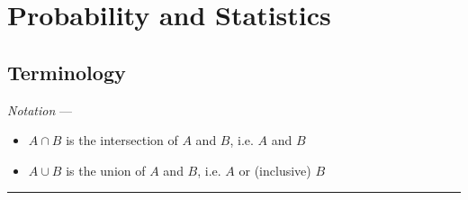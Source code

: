 \section{Probability and Statistics}
\subsection*{Terminology}
\emph{Notation} --- 
\begin{itemize}
    \item $A \cap B$ is the intersection of $A$ and $B$, i.e. $A$ and $B$
    \item $A \cup B$ is the union of $A$ and $B$, i.e. $A$ or (inclusive) $B$
\end{itemize}

{\color{lightgray}\hrule height 0.001mm}

